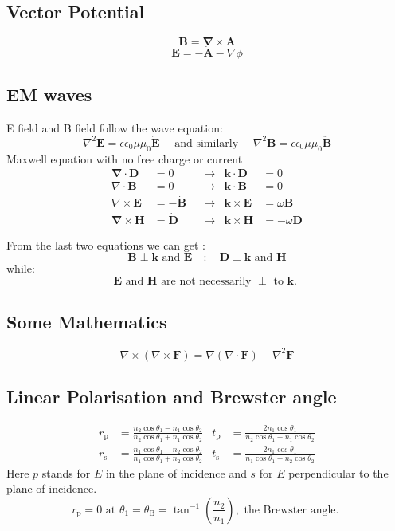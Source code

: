 \documentclass[12pt,a4paper]{article}
\begin{document}
\subsection{Vector Potential}
$$
\boldsymbol{B}=\boldsymbol{\nabla} \times \boldsymbol{A}
$$
$$
\boldsymbol{E}=-\dot{\boldsymbol{A}}-\nabla \phi
$$
\subsection{EM waves}
E field and B field follow the wave equation:
$$
\nabla^2 \boldsymbol{E}=\epsilon \epsilon_0 \mu \mu_0 \ddot{\boldsymbol{E}} \quad \text { and similarly } \quad \nabla^2 \boldsymbol{B}=\epsilon \epsilon_0 \mu \mu_0 \ddot{\boldsymbol{B}}
$$
Maxwell equation with no free charge or current 
$$
\begin{array}{rlrlrl}
\boldsymbol{\nabla} \cdot \boldsymbol{D} & =0 & & \rightarrow & \boldsymbol{k} \cdot \boldsymbol{D} & =0 \\
\nabla \cdot \boldsymbol{B} & =0 & & \rightarrow & \boldsymbol{k} \cdot \boldsymbol{B} & =0 \\
\nabla \times \boldsymbol{E} & =-\dot{\boldsymbol{B}} & & \rightarrow & \boldsymbol{k} \times \boldsymbol{E} & =\omega \boldsymbol{B} \\
\boldsymbol{\nabla} \times \boldsymbol{H} & =\dot{\boldsymbol{D}} & & \rightarrow & \boldsymbol{k} \times \boldsymbol{H} & =-\omega \boldsymbol{D}
\end{array}
$$

From the last two equations we can get :
$$
\boldsymbol{B} \perp \boldsymbol{k} \text { and } \boldsymbol{E} \quad: \quad \boldsymbol{D} \perp \boldsymbol{k} \text { and } \boldsymbol{H}
$$
while:
$$
\boldsymbol{E} \text { and } \boldsymbol{H} \text { are not necessarily } \perp \text { to } \boldsymbol{k} \text {. }
$$
\subsection{Some Mathematics}
$$
\nabla \times(\nabla \times \boldsymbol{F})=\nabla(\nabla \cdot \boldsymbol{F})-\nabla^2 \boldsymbol{F}
$$
\subsection{Linear Polarisation and Brewster angle}
$$
\begin{aligned}
r_{\mathrm{p}} & =\frac{n_2 \cos \theta_1-n_1 \cos \theta_2}{n_2 \cos \theta_1+n_1 \cos \theta_2} & t_{\mathrm{p}} & =\frac{2 n_1 \cos \theta_1}{n_2 \cos \theta_1+n_1 \cos \theta_2} \\
r_{\mathrm{s}} & =\frac{n_1 \cos \theta_1-n_2 \cos \theta_2}{n_1 \cos \theta_1+n_2 \cos \theta_2} & t_{\mathrm{s}} & =\frac{2 n_1 \cos \theta_1}{n_1 \cos \theta_1+n_2 \cos \theta_2}
\end{aligned}
$$
Here $p$ stands for $E$ in the plane of incidence and $s$ for $E$ perpendicular to the plane of incidence.
$$
r_{\mathrm{p}}=0 \text { at } \theta_1=\theta_{\mathrm{B}}=\tan ^{-1}\left(\frac{n_2}{n_1}\right), \text { the Brewster angle. }
$$
\end{document}
